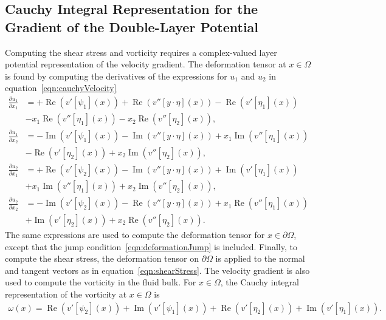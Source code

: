\documentclass[3p]{elsarticle}
\newcommand{\Real}{\Re}
\newcommand{\Imag}{\Im}
\newcommand{\bd}{{\partial}}
\renewcommand{\Re}{{\operatorname{Re}}}
\renewcommand{\Im}{{\operatorname{Im}}}
\newcommand{\pderiv}[2]{\frac{\partial #1}{\partial #2}}
\begin{document}
\subsection{Cauchy Integral Representation for the Gradient of the
Double-Layer Potential}
\label{sec:gradDLPcomplex}
Computing the shear stress and vorticity requires a complex-valued layer
potential representation of the velocity gradient.  The deformation
tensor at $x \in \Omega$ is found by computing the derivatives of the
expressions for $u_1$ and $u_2$ in equation~\eqref{eqn:cauchyVelocity}  
\begin{equation}
\label{eqn:cauchyGradient}
  \begin{aligned}
    \pderiv{u_1}{x_1} &= +\Real (v'[\psi_1](x)) + 
    \Real (v''[y\cdot\eta](x)) - \Real (v'[\eta_1](x)) \\
    &- x_1\Real (v''[\eta_1](x)) - x_2\Real (v''[\eta_2](x)), \\
    \pderiv{u_1}{x_2} &= - \Imag (v'[\psi_1](x)) - 
    \Imag (v''[y\cdot\eta](x)) + x_1\Imag (v''[\eta_1](x)) \\
    &- \Real (v'[\eta_2](x)) + x_2\Imag (v''[\eta_2](x)), \\
    \pderiv{u_2}{x_1} &= +\Real (v'[\psi_2](x)) - 
    \Imag (v''[y\cdot\eta](x)) + \Imag (v'[\eta_1](x))  \\
    &+ x_1\Imag (v''[\eta_1](x)) + x_2\Imag (v''[\eta_2](x)), \\
    \pderiv{u_2}{x_2} &= -\Imag (v'[\psi_2](x)) - 
    \Real (v''[y\cdot\eta](x)) + x_1\Real (v''[\eta_1](x)) \\
    &+ \Imag (v'[\eta_2](x)) + x_2\Real (v''[\eta_2](x)).
  \end{aligned}
\end{equation}
The same expressions are used to compute the deformation tensor for $x
\in \bd\Omega$, except that the jump
condition~\eqref{eqn:deformationJump} is included.  Finally, to compute
the shear stress, the deformation tensor on $\bd\Omega$ is applied to
the normal and tangent vectors as in equation~\eqref{eqn:shearStress}.
The velocity gradient is also used to compute the vorticity in the fluid
bulk.  For $x \in \Omega$, the Cauchy integral representation of the
vorticity at $x \in \Omega$ is
\begin{align}
  \omega(x) = 
    \Real (v'[\psi_2](x)) + \Imag (v'[\psi_1](x))+ 
    \Real (v'[\eta_2](x))+ \Imag (v'[\eta_1](x)).
\end{align}
\end{document}
